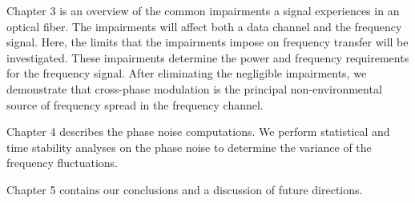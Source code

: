 Chapter 3 is an overview of the common impairments a signal experiences in an optical fiber.  The impairments will affect both a data channel and the frequency signal. Here, the limits that the impairments impose on frequency transfer will be investigated. These impairments determine the power and frequency requirements for the frequency signal. After eliminating the negligible impairments, we demonstrate that cross-phase modulation is the principal non-environmental source of frequency spread in the frequency channel.

Chapter 4 describes the phase noise computations.  We perform statistical and time stability analyses on the phase noise to determine the variance of the frequency fluctuations.

Chapter 5 contains our conclusions and a discussion of future directions.


